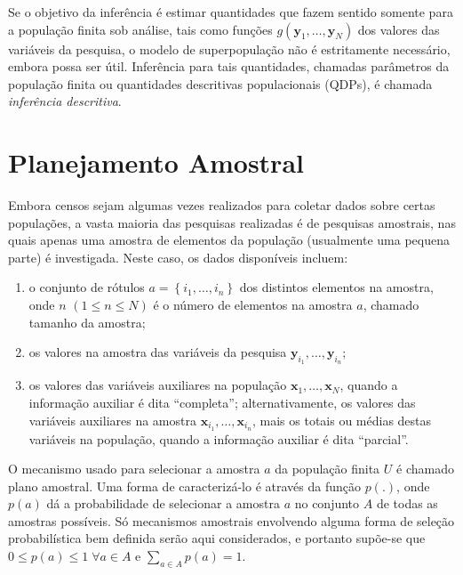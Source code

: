 \documentclass[]{book}
\numberwithin{example}{chapter}
\numberwithin{remark}{chapter}
\numberwithin{definition}{chapter}
\begin{document}
Se o objetivo da inferência é estimar quantidades que fazem sentido
somente para a população finita sob análise, tais como funções
\(g\left( \mathbf{y}_1 ,\ldots, \mathbf{y}_N \right)\) dos valores das
variáveis da pesquisa, o modelo de superpopulação não é estritamente
necessário, embora possa ser útil. Inferência para tais quantidades,
chamadas parâmetros da população finita ou quantidades descritivas
populacionais (QDPs), é chamada \emph{inferência descritiva}.

\section{Planejamento Amostral}\label{planamo}

Embora censos sejam algumas vezes realizados para coletar dados sobre
certas populações, a vasta maioria das pesquisas realizadas é de
pesquisas amostrais, nas quais apenas uma amostra de elementos da
população (usualmente uma pequena parte) é investigada. Neste caso, os
dados disponíveis incluem:

\begin{enumerate}
\def\labelenumi{\arabic{enumi}.}
\item
  o conjunto de rótulos \(a=\left\{ i_1 ,\ldots, i_n \right\}\) dos
  distintos elementos na amostra, onde \(n\)
  \(\left( 1 \leq n \leq N \right)\) é o número de elementos na amostra
  \(a\), chamado tamanho da amostra;
\item
  os valores na amostra das variáveis da pesquisa
  \(\mathbf{y}_{i_1} ,\ldots, \mathbf{y}_{i_n}\);
\item
  os valores das variáveis auxiliares na população
  \(\mathbf{x}_1 ,\ldots, \mathbf{x}_N\), quando a informação auxiliar é
  dita ``completa''; alternativamente, os valores das variáveis
  auxiliares na amostra \(\mathbf{x}_{i_1} ,\ldots, \mathbf{x}_{i_n}\),
  mais os totais ou médias destas variáveis na população, quando a
  informação auxiliar é dita ``parcial''.
\end{enumerate}

O mecanismo usado para selecionar a amostra \(a\) da população finita
\(U\) é chamado plano amostral. Uma forma de caracterizá-lo é através da
função \(p\left( .\right)\), onde \(p(a)\) dá a probabilidade de
selecionar a amostra \(a\) no conjunto \(A\) de todas as amostras
possíveis. Só mecanismos amostrais envolvendo alguma forma de seleção
probabilística bem definida serão aqui considerados, e portanto supõe-se
que \(0 \leq p(a) \leq 1 \; \forall a \in A\) e
\(\sum_{a \in A} p(a)=1\).
\end{document}

